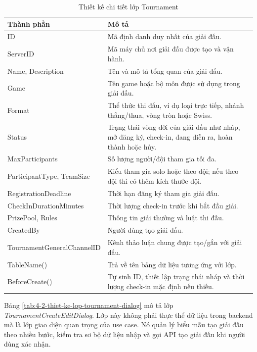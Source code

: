 \begin{table}[H]
    \centering
    \caption{Thiết kế chi tiết lớp Tournament}
    \label{tab:4-1-thiet-ke-lop-tournament}
    \begin{tabular}{|p{}|p{}|}
        \hline
        \textbf{Thành phần} & \textbf{Mô tả} \\ \hline
        ID & Mã định danh duy nhất của giải đấu. \\ \hline
        ServerID & Mã máy chủ nơi giải đấu được tạo và vận hành. \\ \hline
        Name, Description & Tên và mô tả tổng quan của giải đấu. \\ \hline
        Game & Tên game hoặc bộ môn được sử dụng trong giải đấu. \\ \hline
        Format & Thể thức thi đấu, ví dụ loại trực tiếp, nhánh thắng/thua, vòng tròn hoặc Swiss. \\ \hline
        Status & Trạng thái vòng đời của giải đấu như nháp, mở đăng ký, check-in, đang diễn ra, hoàn thành hoặc hủy. \\ \hline
        MaxParticipants & Số lượng người/đội tham gia tối đa. \\ \hline
        ParticipantType, TeamSize & Kiểu tham gia solo hoặc theo đội; nếu theo đội thì có thêm kích thước đội. \\ \hline
        RegistrationDeadline & Thời hạn đăng ký tham gia giải đấu. \\ \hline
        CheckInDurationMinutes & Thời lượng check-in trước khi bắt đầu giải. \\ \hline
        PrizePool, Rules & Thông tin giải thưởng và luật thi đấu. \\ \hline
        CreatedBy & Người dùng tạo giải đấu. \\ \hline
        TournamentGeneralChannelID & Kênh thảo luận chung được tạo/gắn với giải đấu. \\ \hline
        TableName() & Trả về tên bảng dữ liệu tương ứng với lớp. \\ \hline
        BeforeCreate() & Tự sinh ID, thiết lập trạng thái nháp và thời lượng check-in mặc định nếu thiếu. \\ \hline
    \end{tabular}
\end{table}

Bảng \ref{tab:4-2-thiet-ke-lop-tournament-dialog} mô tả lớp \textit{TournamentCreateEditDialog}. Lớp này không phải thực thể dữ liệu trong backend mà là lớp giao diện quan trọng của use case. Nó quản lý biểu mẫu tạo giải đấu theo nhiều bước, kiểm tra sơ bộ dữ liệu nhập và gọi API tạo giải đấu khi người dùng xác nhận.

